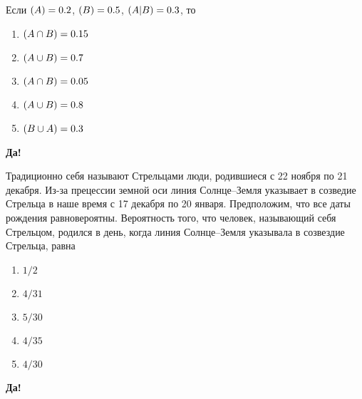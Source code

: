 \documentclass[t]{beamer}
\let\P\relax
\DeclareMathOperator{\P}{\mathbb{P}}
\begin{document}
 \begin{frame} \label{5-Yes} 
\begin{block}{5} 

  Если $\P(A)=0.2$, $\P(B)=0.5$, $\P(A | B) = 0.3$, то
  


 \end{block} 
\begin{enumerate} 
\item[] \hyperlink{5-Yes}{\beamergotobutton{} $\P(A \cap B) = 0.15$}
\item[] \hyperlink{5-No}{\beamergotobutton{} $\P(A \cup B) = 0.7$}
\item[] \hyperlink{5-No}{\beamergotobutton{} $\P(A \cap B) = 0.05$}
\item[] \hyperlink{5-No}{\beamergotobutton{} $\P(A \cup B) = 0.8$}
\item[] \hyperlink{5-No}{\beamergotobutton{} $\P(B \cup A) = 0.3$}
\end{enumerate} 

 \textbf{Да!} 
 \hyperlink{6}{}\end{frame} 


 \begin{frame} \label{6-Yes} 
\begin{block}{6} 

  Традиционно себя называют Стрельцами люди, родившиеся с 22 ноября по 21 декабря. Из-за прецессии земной оси линия Солнце–Земля указывает в созведие Стрельца в наше время с 17 декабря по 20 января. Предположим, что все даты рождения равновероятны. Вероятность того, что человек, называющий себя Стрельцом, родился в день, когда линия Солнце–Земля указывала в созвездие Стрельца, равна
  


 \end{block} 
\begin{enumerate} 
\item[] \hyperlink{6-No}{\beamergotobutton{} $1/2$}
\item[] \hyperlink{6-No}{\beamergotobutton{} $4/31$}
\item[] \hyperlink{6-Yes}{\beamergotobutton{} $5/30$}
\item[] \hyperlink{6-No}{\beamergotobutton{} $4/35$}
\item[] \hyperlink{6-No}{\beamergotobutton{} $4/30$}
\end{enumerate} 

 \textbf{Да!} 
 \hyperlink{7}{}\end{frame} 
\end{document}
